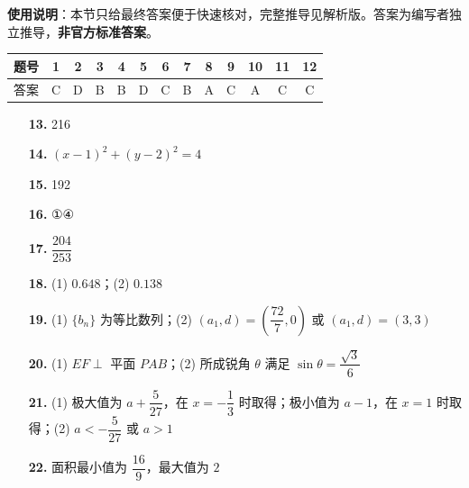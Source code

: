 
\begin{gknotice}
\textbf{使用说明}：本节只给最终答案便于快速核对，完整推导见解析版。答案为编写者独立推导，\textbf{非官方标准答案}。
\end{gknotice}

\begin{center}\begin{tabular}{ccccccccccccc}
\toprule
题号 & 1 & 2 & 3 & 4 & 5 & 6 & 7 & 8 & 9 & 10 & 11 & 12 \\
\midrule
答案 & C & D & B & B & D & C & B & A & C & A & C & C \\
\bottomrule
\end{tabular}\end{center}

\begin{itemize}[leftmargin=2.6em]
  \item[\textbf{13.}] 216
  \item[\textbf{14.}] $(x-1)^2+(y-2)^2=4$
  \item[\textbf{15.}] 192
  \item[\textbf{16.}] ①④
\end{itemize}

\begin{itemize}[leftmargin=2.6em]
  \item[\textbf{17.}] $\dfrac{204}{253}$
  \item[\textbf{18.}] (1) $0.648$；(2) $0.138$
  \item[\textbf{19.}] (1) $\{b_n\}$ 为等比数列；(2) $(a_1,d)=\left(\dfrac{72}{7},0\right)$ 或 $(a_1,d)=(3,3)$
  \item[\textbf{20.}] (1) $EF\perp$ 平面 $PAB$；(2) 所成锐角 $\theta$ 满足 $\sin\theta=\dfrac{\sqrt3}{6}$
  \item[\textbf{21.}] (1) 极大值为 $a+\dfrac5{27}$，在 $x=-\dfrac13$ 时取得；极小值为 $a-1$，在 $x=1$ 时取得；(2) $a<-\dfrac5{27}$ 或 $a>1$
  \item[\textbf{22.}] 面积最小值为 $\dfrac{16}{9}$，最大值为 $2$
\end{itemize}
